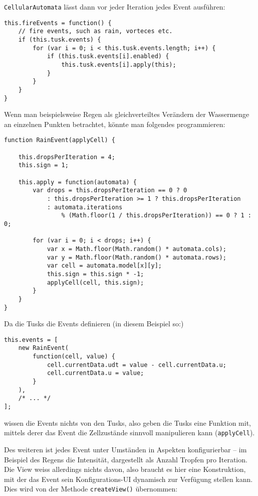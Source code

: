 \documentclass[11pt]{scrreprt} %
\theoremstyle{definition}
\begin{document}
{\tt CellularAutomata} lässt dann vor jeder Iteration jedes Event ausführen:

\begin{lstlisting}
this.fireEvents = function() {
	// fire events, such as rain, vorteces etc.
	if (this.tusk.events) {
		for (var i = 0; i < this.tusk.events.length; i++) {
			if (this.tusk.events[i].enabled) {
				this.tusk.events[i].apply(this);
			}
		}
	}
}
\end{lstlisting}

Wenn man beispielsweise Regen als gleichverteiltes Verändern der Wassermenge an einzelnen Punkten betrachtet, könnte man folgendes programmieren:

\begin{lstlisting}
function RainEvent(applyCell) {

	this.dropsPerIteration = 4;
	this.sign = 1;
	
	this.apply = function(automata) {
		var drops = this.dropsPerIteration == 0 ? 0
			: this.dropsPerIteration >= 1 ? this.dropsPerIteration
			: automata.iterations
				% (Math.floor(1 / this.dropsPerIteration)) == 0 ? 1 : 0;
		
		for (var i = 0; i < drops; i++) {
			var x = Math.floor(Math.random() * automata.cols);
			var y = Math.floor(Math.random() * automata.rows);
			var cell = automata.model[x][y];
			this.sign = this.sign * -1;
			applyCell(cell, this.sign);
		}
	}
}
\end{lstlisting}

Da die Tusks die Events definieren (in diesem Beispiel so:)

\begin{lstlisting}
this.events = [
	new RainEvent(
		function(cell, value) {
			cell.currentData.udt = value - cell.currentData.u;
			cell.currentData.u = value;
		}
	),
 	/* ... */
];
\end{lstlisting}

wissen die Events nichts von den Tusks, also geben die Tusks eine Funktion mit, mittels derer das Event die Zellzustände sinnvoll manipulieren kann ({\tt applyCell}).

Des weiteren ist jedes Event unter Umständen in Aspekten konfigurierbar -- im Beispiel des Regens die Intensität, dargestellt als Anzahl Tropfen pro Iteration. Die View weiss allerdings nichts davon, also braucht es hier eine Konstruktion, mit der das Event sein Konfigurations-UI dynamisch zur Verfügung stellen kann. Dies wird von der Methode {\tt createView()} übernommen:
\end{document}

